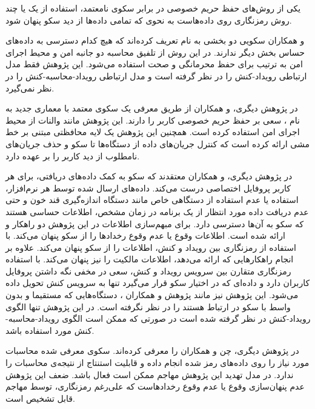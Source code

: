 یکی از روش‌های حفظ حریم خصوصی در برابر سکوی نامعتمد، استفاده از یک یا چند روش رمزنگاری روی داده‌هاست به نحوی که تمامی داده‌ها از دید سکو پنهان شود.

 و همکاران \cite{x3332} سکویی دو بخشی به نام  تعریف کرده‌اند که هیچ کدام دسترسی به داده‌های حساس بخش دیگر ندارند. در این روش از تلفیق محاسبه دو جانبه امن و محیط اجرای امن به ترتیب برای حفظ محرمانگی و صحت استفاده می‌شود. این پژوهش فقط مدل ارتباطی رویداد-کنش را در نظر گرفته است و مدل ارتباطی رویداد-محاسبه-کنش را در نظر نمی‌گیرد.

در پژوهش دیگری،  و همکاران \cite{x3331} از طریق معرفی یک سکوی معتمد با معماری جدید به نام ، سعی بر حفظ حریم خصوصی کاربر را دارند. این پژوهش مانند والنات از محیط اجرای امن استفاده کرده است. همچنین این پژوهش یک لایه محافظتی مبتنی بر خط مشی ارائه کرده است که کنترل جریان‌های داده از دستگاه‌ها تا سکو و حذف جریان‌های نامطلوب از دید کاربر را بر عهده دارد.

در پژوهش دیگری،  و همکاران \cite{x3321} معتقدند که سکو به کمک داده‌های دریافتی، برای هر کاربر پروفایل اختصاصی درست می‌کند. داده‌های ارسال شده توسط هر نرم‌افزار، استفاده یا عدم استفاده از دستگاهی خاص مانند دستگاه اندازه‌گیری قند خون و حتی عدم دریافت داده مورد انتظار از یک برنامه در زمان مشخص، اطلاعات حساسی هستند که سکو به آن‌ها دسترسی دارد. برای مبهم‌سازی اطلاعات در این پژوهش دو راهکار  و  ارائه شده است.  اطلاعات وقوع یا عدم وقوع رخدادها را از سکو پنهان می‌کند. با استفاده از رمزنگاری  بین رویداد و کنش، اطلاعات را از سکو پنهان می‌کند.  علاوه بر انجام راهکارهایی که  ارائه می‌دهد، اطلاعات مالکیت را نیز پنهان می‌کند. با استفاده رمزنگاری متقارن بین سرویس رویداد و کنش، سعی در مخفی نگه داشتن پروفایل کاربران دارد و داده‌ای که در اختیار سکو قرار می‌گیرد تنها به سرویس کنش تحویل داده می‌شود. این پژوهش نیز مانند پژوهش  و همکاران \cite{x3311}، دستگاه‌هایی که مستقیما و بدون واسط با سکو در ارتباط هستند را در نظر نگرفته است. در این پژوهش تنها الگوی رویداد-کنش در نظر گرفته شده است در صورتی که ممکن است الگوی رویداد-محاسبه-کنش مورد استفاده‌ باشد.

در پژوهش دیگری، چن و همکاران \cite{x3322}  را معرفی کرده‌اند. سکوی معرفی شده محاسبات مورد نیاز را روی داده‌های رمز شده انجام داده و قابلیت استنتاج از نتیجه‌ی محاسبات را ندارد. در مدل تهدید این پژوهش مهاجم ممکن است فعال باشد. ضعف این پژوهش عدم پنهان‌سازی وقوع یا عدم وقوع رخدادهاست که علی‌رغم رمزنگاری، توسط مهاجم قابل تشخیص است.

